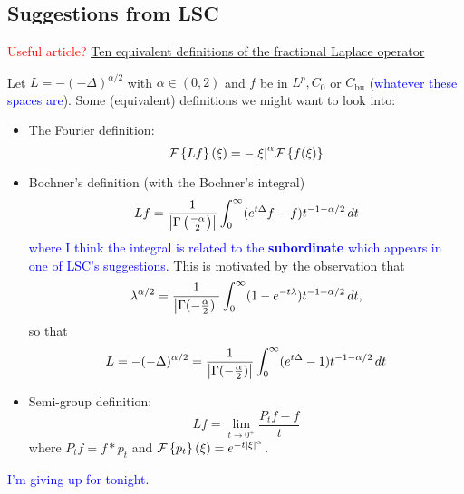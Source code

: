 \documentclass[11pt]{article}
\newcommand{\lp}{\left(}
\newcommand{\rp}{\right)}
\newcommand{\lc}{\left\{}
\newcommand{\rc}{\right\}}
\newcommand{\f}[2]{\frac{#1}{#2}}
\newcommand{\al}{\alpha}
\newcommand{\FT}{\mathcal{F}}
\begin{document}
\subsection{Suggestions from LSC}


\textcolor{red}{Useful article?} \href{https://arxiv.org/pdf/1507.07356.pdf}{\underline{Ten equivalent definitions of the fractional Laplace operator}}

Let $L = -(-\Delta)^{\alpha/2}$ with $\alpha \in (0,2)$ and $f$ be in $L^p, C_0$ or $C_{\mbox{bu}}$ (\textcolor{blue}{whatever these spaces are}). Some (equivalent) definitions we might want to look into:

\begin{itemize}
    \item The Fourier definition:
    \begin{equation*}
        \FT\lc L f \rc(\xi) = - \abs{\xi}^\alpha \FT\lc f(\xi)  \rc
    \end{equation*}
    \item Bochner's definition (with the Bochner's integral)
    \begin{equation*}
        L f = \f{1}{\abs{\Gamma\lp \f{-\al}{2} \rp}} \int^\infty_0 (e^{t\Delta} f - f) t^{-1-\alpha/2}\,dt
    \end{equation*}
    \textcolor{blue}{where I think the integral is related to the \textbf{subordinate} which appears in one of LSC's suggestions.} This is motivated by the observation that
    \begin{equation*}
        \lambda^{\al/2} = \f{1}{\abs{\Gamma(-\f{\al}{2})}} \int_0^\infty (1 - e^{-t\lambda}) t^{-1-\al/2}\,dt,
    \end{equation*}
    so that
    \begin{equation*}
        L = -(-\Delta)^{\al/2} = \f{1}{\abs{\Gamma(-\f{\al}{2})}} \int_0^\infty ( e^{t\Delta} - 1) t^{-1-\al/2}\,dt
    \end{equation*}

    
    
    \item Semi-group definition:
    \begin{equation*}
        L f = \lim_{t\to 0^+} \f{P_t f - f}{t}
    \end{equation*}
    where $P_t f = f * p_t$ and $\FT\lc p_t\rc (\xi) = e^{-t\abs{\xi}^\al}$.
\end{itemize}

\textcolor{blue}{I'm giving up for tonight.}
\end{document}
